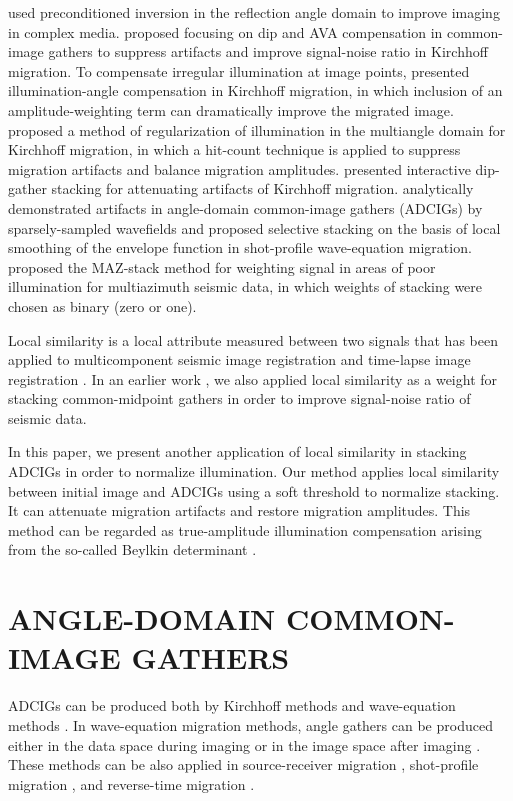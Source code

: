 \cite{Prucha,Kuhl} used preconditioned inversion in the reflection angle domain to 
improve imaging in complex media. \cite{Xu,Brandsberg} proposed focusing on dip and 
AVA compensation in common-image gathers to suppress artifacts and improve signal-noise ratio in Kirchhoff migration. 
To compensate irregular illumination at image points, \cite{Kessinger} presented illumination-angle compensation in 
Kirchhoff migration, in which inclusion of an amplitude-weighting term can dramatically improve the migrated image. 
\cite{Bloor,Audebert} proposed a method of regularization of illumination in the multiangle 
domain for Kirchhoff migration, in which a hit-count technique is applied to suppress migration artifacts and balance 
migration amplitudes. \cite{Qin} presented interactive dip-gather stacking for attenuating artifacts of Kirchhoff 
migration. \cite{Tang} analytically demonstrated artifacts in angle-domain common-image gathers (ADCIGs) by sparsely-sampled 
wavefields and proposed selective stacking on the basis of local smoothing of the envelope function in shot-profile wave-equation 
migration. \cite{Manning} proposed the MAZ-stack method for weighting signal in areas of poor illumination for multiazimuth 
seismic data, in which weights of stacking were chosen as binary (zero or one). 

Local similarity is a local attribute measured between two signals \cite[]{Fomel2007b} that has been applied to multicomponent 
seismic image registration \cite[]{Fomel2005,Fomel2007b} and time-lapse image registration \cite[]{Fomel2009}. 
In an earlier work \cite[]{Liu}, we also applied local similarity as a weight for stacking common-midpoint gathers 
in order to improve signal-noise ratio of seismic data. 

In this paper, we present another application of local similarity in stacking ADCIGs in order to normalize illumination. 
Our method applies local similarity between initial image and ADCIGs using a soft threshold to normalize stacking. It 
can attenuate migration artifacts and restore migration amplitudes. This method can be regarded as true-amplitude 
illumination compensation arising from the so-called Beylkin determinant \cite[]{Beylkin,Albertin,Audebert}. 

\section{ANGLE-DOMAIN COMMON-IMAGE GATHERS}

ADCIGs can be produced both by Kirchhoff methods \cite[]{Xu,Brandsberg} and wave-equation methods \cite[]{Prucha,Mosher,Xie2002,Sava2003,Biondi2004}. In wave-equation migration methods, angle gathers can be produced either in the data space during imaging or in the image space after imaging \cite[]{Fomel2004}. These methods can be also applied in source-receiver migration \cite[]{Sava2003}, shot-profile migration \cite{Rickett}, and reverse-time migration \cite[]{Biondi2002,Zhang2007}.

